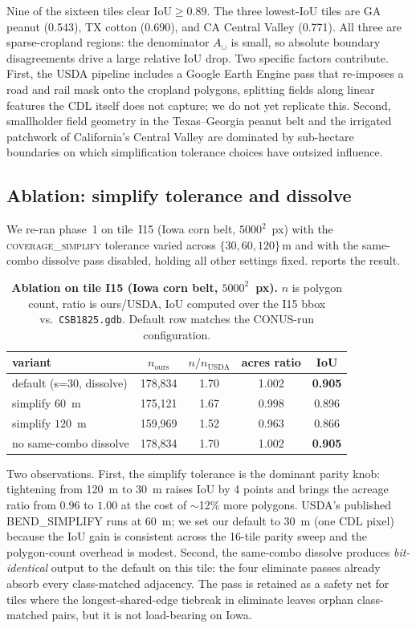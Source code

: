 \documentclass{article}
\begin{document}
Nine of the sixteen tiles clear $\text{IoU} \geq 0.89$. The three
lowest-IoU tiles are GA peanut (0.543), TX cotton (0.690), and CA
Central Valley (0.771). All three are sparse-cropland regions: the
denominator $A_\cup$ is small, so absolute boundary disagreements drive
a large relative IoU drop. Two specific factors contribute. First, the
USDA pipeline includes a Google Earth Engine pass that re-imposes a
road and rail mask onto the cropland polygons, splitting fields along
linear features the CDL itself does not capture; we do not yet
replicate this. Second, smallholder field geometry in the Texas--Georgia
peanut belt and the irrigated patchwork of California's Central Valley
are dominated by sub-hectare boundaries on which simplification
tolerance choices have outsized influence.

\subsection{Ablation: simplify tolerance and dissolve}
\label{sec:results-ablation}

We re-ran phase~1 on tile~I15 (Iowa corn belt, $5000^2$~px) with the
\textsc{coverage\_simplify} tolerance varied across $\{30, 60, 120\}\,
\text{m}$ and with the same-combo dissolve pass disabled, holding all
other settings fixed.  reports the result.

\begin{table}[t]
\centering
\caption{\textbf{Ablation on tile I15 (Iowa corn belt, $5000^2$~px).}
$n$ is polygon count, ratio is ours/USDA, IoU computed over the I15
bbox vs.\ \texttt{CSB1825.gdb}. Default row matches the CONUS-run
configuration.}
\label{tab:ablation}
\small
\begin{tabular}{lcccc}
\toprule
variant                       & $n_\text{ours}$ & $n/n_\text{USDA}$ & acres ratio & IoU \\
\midrule
default (s=30, dissolve)      & 178{,}834 & 1.70 & 1.002 & \textbf{0.905} \\
simplify $60$~m               & 175{,}121 & 1.67 & 0.998 & 0.896 \\
simplify $120$~m              & 159{,}969 & 1.52 & 0.963 & 0.866 \\
no same-combo dissolve        & 178{,}834 & 1.70 & 1.002 & \textbf{0.905} \\
\bottomrule
\end{tabular}
\end{table}

Two observations. First, the simplify tolerance is the dominant parity
knob: tightening from 120~m to 30~m raises IoU by 4 points and brings
the acreage ratio from $0.96$ to $1.00$ at the cost of $\sim$12\% more
polygons. USDA's published \textsc{BEND\_SIMPLIFY} runs at 60~m; we set
our default to 30~m (one CDL pixel) because the IoU gain is consistent
across the 16-tile parity sweep and the polygon-count overhead is
modest. Second, the same-combo dissolve produces \emph{bit-identical}
output to the default on this tile: the four eliminate passes already
absorb every class-matched adjacency. The pass is retained as a safety
net for tiles where the longest-shared-edge tiebreak in eliminate
leaves orphan class-matched pairs, but it is not load-bearing on Iowa.
\end{document}
